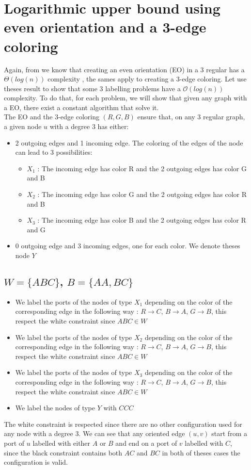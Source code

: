 \section{Logarithmic upper bound using even orientation and a 3-edge coloring}
Again, from \cite{1} we know that creating an even orientation (EO) in a 3 regular has a $\Theta(log(n))$ complexity \cite{1}, the sames apply to creating a 3-edge coloring. Let use theses result to show that some 3 labelling problems have a $\mathcal{O}(log(n))$ complexity. To do that, for each problem, we will show that given any graph with a EO, there exist a constant algorithm that solve it.\\
The EO and the 3-edge coloring $(R,G,B)$ ensure that, on any 3 regular graph, a given node $u$ with a degree 3 has either:
\begin{itemize}
    \item 2 outgoing edges and 1 incoming edge.
    The coloring of the edges of the node can lead to 3 possibilities:
    \begin{itemize}
        \item $X_1$ : The incoming edge has color R and the 2 outgoing edges has color G and B
        \item $X_2$ : The incoming edge has color G and the 2 outgoing edges has color R and B
        \item $X_3$ : The incoming edge has color B and the 2 outgoing edges has color R and G
    \end{itemize}
    \item 0 outgoing edge and 3 incoming edges, one for each color. We denote theses node $Y$
\end{itemize}
\subsection[(W = (ABC), B = (AA,BC)]{$W = \{ABC\}$, $B = \{AA, BC\}$}
\begin{itemize}
    \item We label the ports of the nodes of type $X_1$ depending on the color of the corresponding edge in the following way : $R \rightarrow C$, $B \rightarrow A$, $G \rightarrow B$, this respect the white constraint since $ABC\in W$
    \item We label the ports of the nodes of type $X_2$ depending on the color of the corresponding edge in the following way : $R \rightarrow C$, $B \rightarrow A$, $G \rightarrow B$, this respect the white constraint since $ABC\in W$
    \item We label the ports of the nodes of type $X_3$ depending on the color of the corresponding edge in the following way : $R \rightarrow C$, $B \rightarrow A$, $G \rightarrow B$, this respect the white constraint since $ABC\in W$
    \item We label the nodes of type $Y$ with $CCC$
\end{itemize}
The white constraint is respected since there are no other configuration used for any node with a degree 3.
We can see that any oriented edge $(u,v)$ start from a port of $u$ labelled with either $A$ or $B$ and end on a port of $v$ labelled with $C$, since the black constraint contains both $AC$ and $BC$ in both of theses cases the configuration is valid.



